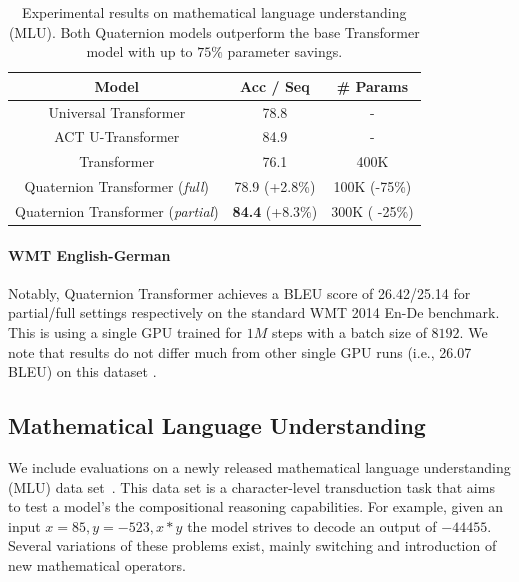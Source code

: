 \documentclass[11pt,a4paper]{article}
\begin{document}
\begin{table}
  \centering
    \begin{tabular}{c|c|c}
    \hline
    Model   & \multicolumn{1}{c|}{Acc / Seq} & \multicolumn{1}{c}{\# Params} \\
    \hline
    Universal Transformer & 78.8&- \\
    ACT U-Transformer & 84.9 &- \\
    \hline
    Transformer & 76.1& 400K\\
    Quaternion Transformer (\emph{full}) & 78.9 (+2.8\%) & 100K  (-75\%)\\
    Quaternion Transformer (\emph{partial}) & \textbf{84.4} (+8.3\%) & 300K ( -25\%)\\
    \hline
    \end{tabular}%
    \caption{Experimental results on mathematical language understanding (MLU). Both Quaternion models outperform the base Transformer model with up to $75\%$ parameter savings.}
    \label{tab:mlu}%

\end{table}%

\paragraph{WMT English-German} Notably, Quaternion Transformer achieves a BLEU score of 26.42/25.14 for partial/full settings respectively on the standard WMT 2014 En-De benchmark. This is using a single GPU trained for $1M$ steps with a batch size of $8192$. We note that results do not differ much from other single GPU runs (i.e., 26.07 BLEU) on this dataset \cite{nguyen2019phrasebased}.

\subsection{Mathematical Language Understanding}
We include evaluations on a newly released mathematical language understanding (MLU) data set~\cite{DBLP:journals/corr/abs-1812-02825}. This data set is a character-level transduction task that aims to test a model's the compositional reasoning capabilities. For example, given an input $x=85, y=-523, x * y$ the model strives to decode an output of $-44455$. Several variations of these problems exist, mainly switching and introduction of new mathematical operators.
\end{document}
